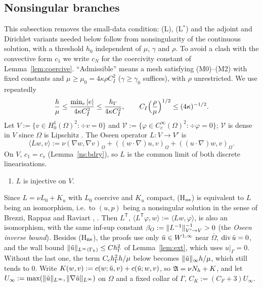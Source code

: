 
\subsection{Nonsingular branches}\label{ns:branchsec}

This subsection removes the small-data condition: (L), (L$^\ast$) and the adjoint and Dirichlet variants needed below follow from nonsingularity of the continuous solution, with a threshold $h_0$ independent of $\mu$, $\gamma$ and $\rho$. To avoid a clash with the convective form $c_1$ we write $c_N$ for the coercivity constant of Lemma~\ref{lem:coercive}. ``Admissible'' means a mesh satisfying (M0)--(M2) with fixed constants and $\mu\ge\mu_0=4\kappa\rho C_I^2$ ($\gamma\ge\gamma_0$ suffices), with $\rho$ unrestricted. We use repeatedly
\begin{equation}\label{nb:hmu}
\frac h\mu\le\frac{\min_e|e|}{4\kappa C_I^2}\le\frac{h_\Gamma}{4\kappa C_I^2},\qquad C_I\Bigl(\frac\rho\mu\Bigr)^{1/2}\le(4\kappa)^{-1/2}.
\end{equation}
Let $V:=\{v\in H^1_0(\Omega)^2:\div v=0\}$ and $\mathcal V:=\{\varphi\in C^\infty_c(\Omega)^2:\div\varphi=0\}$; $\mathcal V$ is dense in $V$ since $\Omega$ is Lipschitz \cite[Ch.~I, Thm~1.6]{Temam}. The Oseen operator $L:V\to V'$ is
\[
\langle Lw,v\rangle:=\nu(\nabla w,\nabla v)_\Omega+((w\cdot\nabla)u,v)_\Omega+((u\cdot\nabla)w,v)_\Omega .
\]
On $V$, $c_1=c_s$ (Lemma~\ref{ns:bdry}), so $L$ is the common limit of both discrete linearisations.
\begin{enumerate}
\item[(H$_{\rm ns}$)] $L$ is injective on $V$.
\end{enumerate}
Since $L=\nu L_0+K_u$ with $L_0$ coercive and $K_u$ compact, (H$_{\rm ns}$) is equivalent to $L$ being an isomorphism, i.e.\ to $(u,p)$ being a nonsingular solution in the sense of Brezzi, Rappaz and Raviart \cite{BRR1980}, \cite[Ch.~IV]{GiraultRaviart}. Then $L^{\mathsf T}$, $\langle L^{\mathsf T}\varphi,w\rangle:=\langle Lw,\varphi\rangle$, is also an isomorphism, with the same inf-sup constant $\beta_O:=\lVert L^{-1}\rVert^{-1}_{V'\to V}>0$ (the \emph{Oseen inverse bound}). Besides (H$_{\rm ns}$), the proofs use only $\tilde u\in W^{1,\infty}$ near $\overline\Omega$, $\operatorname{div}\tilde u=0$, and the wall bound $\lVert \tilde u\rVert_{L^\infty(\Gamma_h)}\le Ch_\Gamma^2$ of Lemma~\ref{lem:ext}, which uses $u|_\Gamma=0$. Without the last one, the term $C_eh_\Gamma^2h/\mu$ below becomes $\lVert \tilde u\rVert_\infty h/\mu$, which still tends to $0$. Write $K(w,v):=c(w;\tilde u,v)+c(\tilde u;w,v)$, so $\mathfrak A=\nu N_h+K$, and let $U_\infty:=\max(\lVert \tilde u\rVert_{L^\infty},\lVert \nabla\tilde u\rVert_{L^\infty})$ on $\Omega$ and a fixed collar of $\Gamma$, $C_K:=(C_F+3)U_\infty$.

